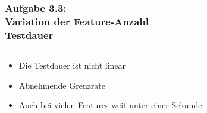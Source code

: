 \documentclass[accentcolor=tud7b,noresetcounter]{tudbeamer}
\begin{document}
	\begin{frame}
	  \frametitle{Aufgabe 3.3:\\ Variation der Feature-Anzahl\\ Testdauer}
	  \begin{columns}[T]%
	    \begin{column}{0.4\textwidth}
	    \begin{itemize}[] %
	    \item Die Testdauer ist nicht linear
	    \item Abnehmende Grenzrate
	    \item Auch bei vielen Features weit unter einer Sekunde
	    \end{itemize}
	    \end{column}
	    \begin{column}{0.6\textwidth}
	    \end{column}
	    \end{columns}
	  
	\end{frame}
	




\end{document}

